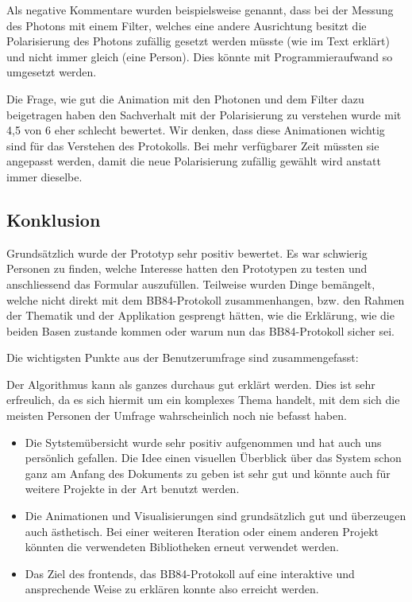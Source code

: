 \documentclass[a4paper,10.2pt,pdftex]{scrartcl}%
\begin{document}
Als negative Kommentare wurden beispielsweise genannt, dass bei der Messung des Photons mit einem Filter, welches eine andere Ausrichtung besitzt die Polarisierung des Photons zufällig gesetzt werden müsste (wie im Text erklärt) und nicht immer gleich (eine Person). Dies könnte mit Programmieraufwand so umgesetzt werden.

Die Frage, wie gut die Animation mit den Photonen und dem Filter dazu beigetragen haben den Sachverhalt mit der Polarisierung zu verstehen wurde mit 4,5 von 6 eher schlecht bewertet. Wir denken, dass diese Animationen wichtig sind für das Verstehen des Protokolls. Bei mehr verfügbarer Zeit müssten sie angepasst werden, damit die neue Polarisierung zufällig gewählt wird anstatt immer dieselbe.

\subsection{Konklusion}
Grundsätzlich wurde der Prototyp sehr positiv bewertet. Es war schwierig Personen zu finden, welche Interesse hatten den Prototypen zu testen und anschliessend das Formular auszufüllen. Teilweise wurden Dinge bemängelt, welche nicht direkt mit dem BB84-Protokoll zusammenhangen, bzw. den Rahmen der Thematik und der Applikation gesprengt hätten, wie die Erklärung, wie die beiden Basen zustande kommen oder warum nun das BB84-Protokoll sicher sei.

Die wichtigsten Punkte aus der Benutzerumfrage sind zusammengefasst:


Der Algorithmus kann als ganzes durchaus gut erklärt werden. Dies ist sehr erfreulich, da es sich hiermit um ein komplexes Thema handelt, mit dem sich die meisten Personen der Umfrage wahrscheinlich noch nie befasst haben.
\begin{itemize}
\item Die Sytstemübersicht wurde sehr positiv aufgenommen und hat auch uns persönlich gefallen. Die Idee einen visuellen Überblick über das System schon ganz am Anfang des Dokuments zu geben ist sehr gut und könnte auch für weitere Projekte in der Art benutzt werden.
\item Die Animationen und Visualisierungen sind grundsätzlich gut und überzeugen auch ästhetisch. Bei einer weiteren Iteration oder einem anderen Projekt könnten die verwendeten Bibliotheken erneut verwendet werden.
\item Das Ziel des frontends, das BB84-Protokoll auf eine interaktive und ansprechende Weise zu erklären konnte also erreicht werden. 
\end{itemize}
\end{document}
